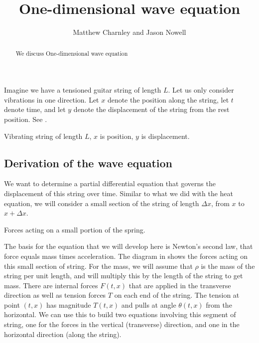 \documentclass{ximera}
\title{One-dimensional wave equation}
\author{Matthew Charnley and Jason Nowell}
\begin{document}
\begin{abstract}
    We discuss One-dimensional wave equation
\end{abstract}
\maketitle

\label{we:section}




Imagine we have a tensioned guitar string of length $L$.  Let us only consider vibrations in one direction.  Let $x$ denote the position along the string, let $t$ denote time, and let $y$ denote the displacement of the string from the rest position. See .

\begin{myfig}
    \capstart
    
    \caption{Vibrating string of length $L$, $x$ is position, $y$ is displacement.\label{we:vibstrfig}}
\end{myfig}

\subsection{Derivation of the wave equation}

We want to determine a partial differential equation that governs the displacement of this string over time. Similar to what we did with the heat equation, we will consider a small section of the string of length $\Delta x$, from $x$ to $x + \Delta x$.

\begin{myfig}
    \capstart
    \caption{Forces acting on a small portion of the spring.\label{fig:forceWave}}
\end{myfig}

The basis for the equation that we will develop here is Newton's second law, that force equals mass times acceleration. The diagram in  shows the forces acting on this small section of string. For the mass, we will assume that $\rho$ is the mass of the string per unit length, and will multiply this by the length of the string to get mass. There are internal forces $F(t, x)$ that are applied in the transverse direction as well as tension forces $T$ on each end of the string. The tension at point $(t,x)$ has magnitude $T(t,x)$ and pulls at angle $\theta(t,x)$ from the horizontal. We can use this to build two equations involving this segment of string, one for the forces in the vertical (transverse) direction, and one in the horizontal direction (along the string). 
\end{document}
